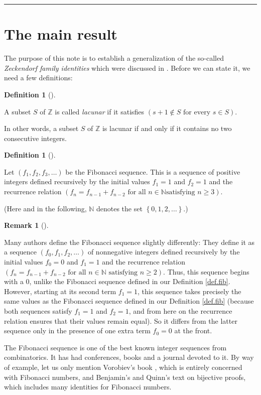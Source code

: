\documentclass[numbers=enddot,12pt,final,onecolumn,notitlepage]{scrartcl}%
\numberwithin{exer}{section}
\theoremstyle{definition}
\newtheorem{defi}[theo]{Definition}
\newenvironment{definition}[1][]
{\begin{defi}[#1]\begin{leftbar}}
{\end{leftbar}\end{defi}}
\newtheorem{remk}[theo]{Remark}
\newenvironment{remark}[1][]
{\begin{remk}[#1]\begin{leftbar}}
{\end{leftbar}\end{remk}}
\begin{document}
\hrule


\section{The main result}

The purpose of this note is to establish a generalization of the so-called
\textit{Zeckendorf family identities} which were discussed in \cite{1}. Before
we can state it, we need a few definitions:

\begin{definition}
A subset $S$ of $\mathbb{Z}$ is called \textit{lacunar} if it satisfies
$\left(  s+1\notin S\text{ for every }s\in S\right)  $.
\end{definition}

In other words, a subset $S$ of $\mathbb{Z}$ is lacunar if and only if it
contains no two consecutive integers.

\begin{definition}
\label{def.fib}Let $\left(  f_{1},f_{2},f_{3},\ldots\right)  $ be the
Fibonacci sequence. This is a sequence of positive integers defined
recursively by the initial values $f_{1}=1$ and $f_{2}=1$ and the recurrence
relation $\left(  f_{n}=f_{n-1}+f_{n-2}\text{ for all }n\in\mathbb{N}\text{
satisfying }n\geq3\right)  $.
\end{definition}

(Here and in the following, $\mathbb{N}$ denotes the set $\left\{
0,1,2,\ldots\right\}  $.)

\begin{remark}
Many authors define the Fibonacci sequence slightly differently: They define
it as a sequence $\left(  f_{0},f_{1},f_{2},\ldots\right)  $ of nonnegative
integers defined recursively by the initial values $f_{0}=0$ and $f_{1}=1$ and
the recurrence relation $\left(  f_{n}=f_{n-1}+f_{n-2}\text{ for all }%
n\in\mathbb{N}\text{ satisfying }n\geq2\right)  $. Thus, this sequence begins
with a $0$, unlike the Fibonacci sequence defined in our Definition
\ref{def.fib}. However, starting at its second term $f_{1}=1$, this sequence
takes precisely the same values as the Fibonacci sequence defined in our
Definition \ref{def.fib} (because both sequences satisfy $f_{1}=1$ and
$f_{2}=1$, and from here on the recurrence relation ensures that their values
remain equal). So it differs from the latter sequence only in the presence of
one extra term $f_{0}=0$ at the front.
\end{remark}

The Fibonacci sequence is one of the best known integer sequences from
combinatorics. It has had conferences, books and a journal devoted to it. By
way of example, let us only mention Vorobiev's book \cite{Vorobi02}, which is
entirely concerned with Fibonacci numbers, and Benjamin's and Quinn's text
\cite{BenQui03} on bijective proofs, which includes many identities for
Fibonacci numbers.
\end{document}
